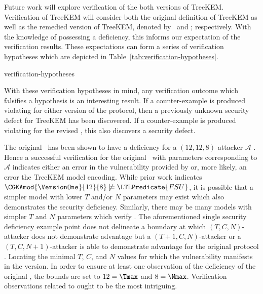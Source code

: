 Future work will explore verification of the both versions of TreeKEM.\@
Verification of TreeKEM will consider both the original definition of TreeKEM as well as the remedied version of TreeKEM, denoted by \VersionOne\ and \VersionTwo; respectively.
With the knowledge of \VersionOne possessing a  deficiency, this informs our expectation of the verification results.
These expectations can form a series of verification hypotheses which are depicted in Table\ \ref{tab:verification-hypotheses}.

\begin{table}[ht!]                                                                                                       \centering 
\caption{%
\label{tab:verification-hypotheses}%
Verification Hypotheses of .
}%
{verification-hypotheses}
\end{table}

With these verification hypotheses in mind, any verification outcome which falsifies a hypothesis is an interesting result.
If a counter-example is produced violating  for either version of the protocol, then a previously unknown security defect for TreeKEM has been discovered.
If a counter-example is produced violating  for the revised \VersionTwo, this also discovers a security defect.

The original \VersionOne\ has been shown to have a  deficiency for a \((12, 12, 8)\)-attacker \(\mathcal{A}\) \autocite{alwen2020security}.
Hence a successful  verification for the original \VersionOne\ with parameters corresponding to \(\mathcal{A}\) indicates either an error in the vulnerability provided by \autocite{alwen2020security} or, more likely, an error the TreeKEM model encoding.
While prior work \autocite{alwen2020security} indicates \( \CGKAmod{\VersionOne}{12}{8} \not \models \LTLPredicate{FSU} \), it is possible that a simpler model with lower \(T\) and/or \(N\) parameters may exist which also demonstrates the  security deficiency.
Similarly, there may be many  models with simpler \(T\) and \(N\) parameters which verify .
The aforementioned single  security deficiency example point does not delineate a boundary at which \((T, C, N)\)-attacker does not demonstrate advantage but a \((T+1, C, N)\)-attacker or a \((T, C, N+1)\)-attacker is able to demonstrate advantage for the original protocol \VersionOne.
Locating the minimal \(T\), \(C\), and \(N\) values for which the vulnerability manifests in the \VersionOne version.
In order to ensure at least one observation of the  deficiency of the original \VersionOne, the bounds are set to \(12 = \Tmax\) and \(8 = \Nmax\).
Verification observations related to  ought to be the most intriguing.

